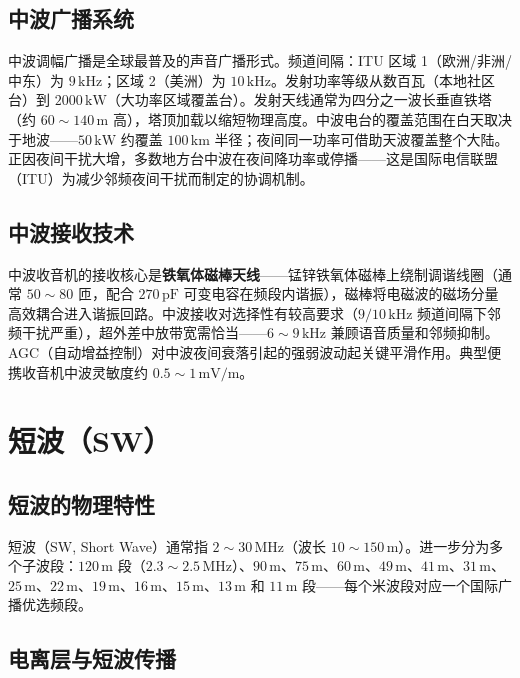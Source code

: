 \documentclass[12pt,UTF8]{ctexbook}
\begin{document}
\subsection{中波广播系统}

中波调幅广播是全球最普及的声音广播形式。频道间隔：ITU 区域 1（欧洲/非洲/中东）为 $9\,\mathrm{kHz}$；区域 2（美洲）为 $10\,\mathrm{kHz}$。发射功率等级从数百瓦（本地社区台）到 $2000\,\mathrm{kW}$（大功率区域覆盖台）。发射天线通常为四分之一波长垂直铁塔（约 $60\sim140\,\mathrm{m}$ 高），塔顶加载以缩短物理高度。中波电台的覆盖范围在白天取决于地波——$50\,\mathrm{kW}$ 约覆盖 $100\,\mathrm{km}$ 半径；夜间同一功率可借助天波覆盖整个大陆。正因夜间干扰大增，多数地方台中波在夜间降功率或停播——这是国际电信联盟（ITU）为减少邻频夜间干扰而制定的协调机制。

\subsection{中波接收技术}

中波收音机的接收核心是\textbf{铁氧体磁棒天线}——锰锌铁氧体磁棒上绕制调谐线圈（通常 $50\sim80$ 匝，配合 $270\,\mathrm{pF}$ 可变电容在频段内谐振），磁棒将电磁波的磁场分量高效耦合进入谐振回路。中波接收对选择性有较高要求（$9/10\,\mathrm{kHz}$ 频道间隔下邻频干扰严重），超外差中放带宽需恰当——$6\sim9\,\mathrm{kHz}$ 兼顾语音质量和邻频抑制。AGC（自动增益控制）对中波夜间衰落引起的强弱波动起关键平滑作用。典型便携收音机中波灵敏度约 $0.5\sim1\,\mathrm{mV/m}$。

\section{短波（SW）}
\label{sec:short_wave}

\subsection{短波的物理特性}

短波（SW, Short Wave）通常指 $2\sim30\,\mathrm{MHz}$（波长 $10\sim150\,\mathrm{m}$）。进一步分为多个子波段：$120\,\mathrm{m}$ 段（$2.3\sim2.5\,\mathrm{MHz}$）、$90\,\mathrm{m}$、$75\,\mathrm{m}$、$60\,\mathrm{m}$、$49\,\mathrm{m}$、$41\,\mathrm{m}$、$31\,\mathrm{m}$、$25\,\mathrm{m}$、$22\,\mathrm{m}$、$19\,\mathrm{m}$、$16\,\mathrm{m}$、$15\,\mathrm{m}$、$13\,\mathrm{m}$ 和 $11\,\mathrm{m}$ 段——每个米波段对应一个国际广播优选频段。

\subsection{电离层与短波传播}
\end{document}
